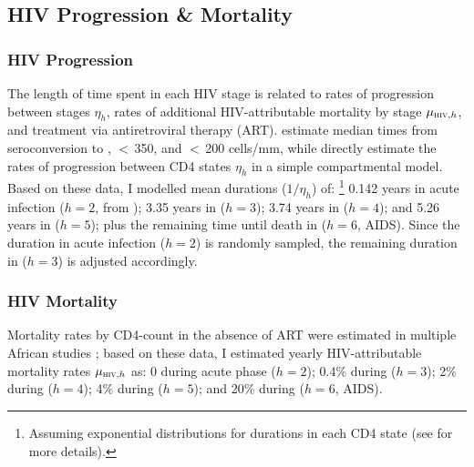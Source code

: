 \subsection{HIV Progression \& Mortality}\label{model.par.hiv}
\subsubsection{HIV Progression}\label{model.par.hiv.dur}
The length of time spent in each HIV stage is related to
rates of progression between stages $\eta_{h}$,
rates of additional HIV-attributable mortality by stage $\mu_{\textsc{hiv},h}$,
and treatment via antiretroviral therapy (ART).
\citet{Lodi2011} estimate median times from seroconversion to
, $<$\,350, and $<$\,200 cells/mm, while
\citet{Mangal2017} directly estimate the rates of progression between CD4 states $\eta_{h}$
in a simple compartmental model.
Based on these data, I modelled mean durations ($1/\eta_{h}$) of:%
\footnote{Assuming exponential distributions for durations in each CD4 state
  (see  for more details).}
0.142 years in acute infection ($h=2$, from );
3.35 years in  ($h=3$);
3.74 years in  ($h=4$); and
5.26 years in  ($h=5$); plus
the remaining time until death in  ($h=6$, AIDS).
Since the duration in acute infection ($h=2$) is randomly sampled,
the remaining duration in  ($h=3$) is adjusted accordingly.
\subsubsection{HIV Mortality}\label{model.par.hiv.mort}
Mortality rates by CD4-count in the absence of ART were estimated in
multiple African studies \cite{Badri2006,Anglaret2012,Mangal2017};
based on these data, I estimated yearly HIV-attributable mortality rates $\mu_{\textsc{hiv},h}$ as:
0 during acute phase ($h=2$);
0.4\% during  ($h=3$);
2\% during  ($h=4$);
4\% during  ($h=5$); and
20\% during  ($h=6$, AIDS).
\pagebreak %
